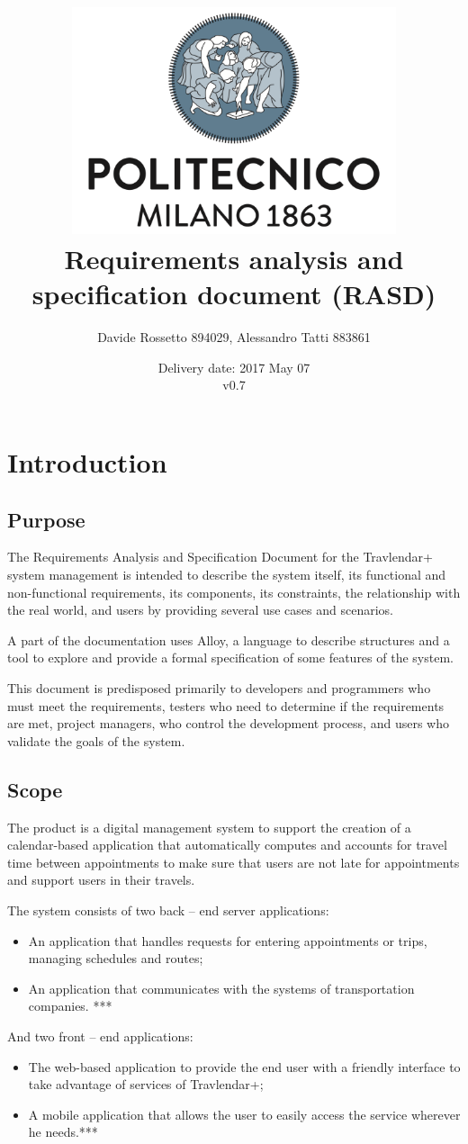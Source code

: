 \documentclass{article}
\title{ 
	\includegraphics[width=95mm]{img/PolimiLogo.png} \\
	\bigskip
	Requirements analysis and specification document (RASD)
}
\author{
	Davide Rossetto 894029, Alessandro Tatti 883861
}
\date{
	Delivery date: 2017 May 07\\
	\bigskip v0.7
}
\begin{document}
	
\maketitle
\newpage
\tableofcontents
\newpage
	
	
	\section{Introduction}
	
	
	\subsection{Purpose}
	The Requirements Analysis and Specification Document for the Travlendar+ system management is intended to describe the system itself, its functional and non-functional requirements, its components, its constraints, the relationship with the real world, and users by providing several use cases and scenarios.
	
	A part of the documentation uses Alloy, a language to describe structures and a tool to explore and provide a formal specification of some features of the system.
	
	\bigskip
	This document is predisposed primarily to developers and programmers who must meet the requirements, testers who need to determine if the requirements are met, project managers, who control the development process, and users who validate the goals of the system.
	
	
	\subsection{Scope}
	The product is a digital management system to support the creation of a calendar-based application that automatically computes and accounts for travel time between appointments to make sure that users are not late for appointments and support users in their travels.

	\bigskip
	The system consists of two back -- end server applications:
	\begin{itemize}
		\item An application that handles requests for entering appointments or trips, managing schedules and routes;
		\item An application that communicates with the systems of transportation companies. ***
	\end{itemize}

	\bigskip
	And two front -- end applications:
	\begin{itemize}
		\item The web-based application to provide the end user with a friendly interface to take advantage of services of Travlendar+;
		\item A mobile application that allows the user to easily access the service wherever he needs.***
	\end{itemize}
\end{document}
